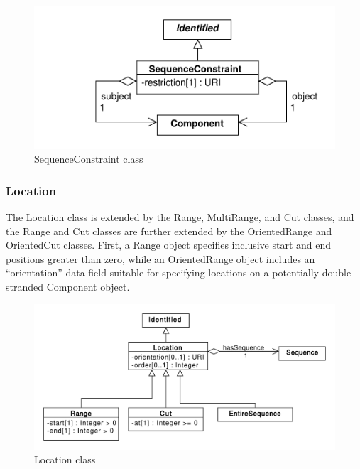\documentclass[draftspec]{sbmlpkgspec}
\begin{document}
\begin{figure}[ht]
\begin{center}
\includegraphics[scale=0.6]{uml/sequence_constraint}
\caption[]{SequenceConstraint class}
\label{uml:sequence_constraint}
\end{center}
\end{figure}




\subsubsection{Location}
\label{sec:Location}
The Location class is extended by the Range, MultiRange, and Cut classes, and the Range and Cut classes are further extended by the OrientedRange and OrientedCut classes. First, a Range object specifies inclusive start and end positions greater than zero, while an OrientedRange object includes an “orientation” data field suitable for specifying locations on a potentially double-stranded Component object.

\begin{figure}[ht]
\begin{center}
\includegraphics[scale=0.6]{uml/location}
\caption[]{Location class}
\label{uml:location}
\end{center}
\end{figure}
\end{document}
